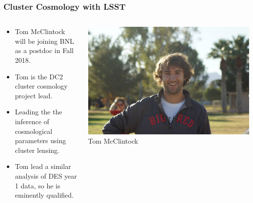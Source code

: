 \documentclass{beamer}
\begin{document}
\frame
{

    \frametitle{Cluster Cosmology with LSST}


    \begin{columns}
        \begin{column}{0.5\textwidth}

            \begin{itemize}

                \item Tom McClintock will be joining BNL as a postdoc
                    in Fall 2018.

                \item Tom is the DC2 cluster cosmology project lead.

                \item Leading the the inference of cosmological parameters
                    using cluster lensing.

                \item Tom lead a similar analysis of DES year 1 data, so
                    he is eminently qualified.

            \end{itemize}
        \end{column}

        \begin{column}{0.5\textwidth}
            \begin{center}
                \includegraphics[width=\textwidth]{TomMportrait.jpg}
                \newline
                {\tiny Tom McClintock}
            \end{center}
        \end{column}

    \end{columns}


}
\end{document}
